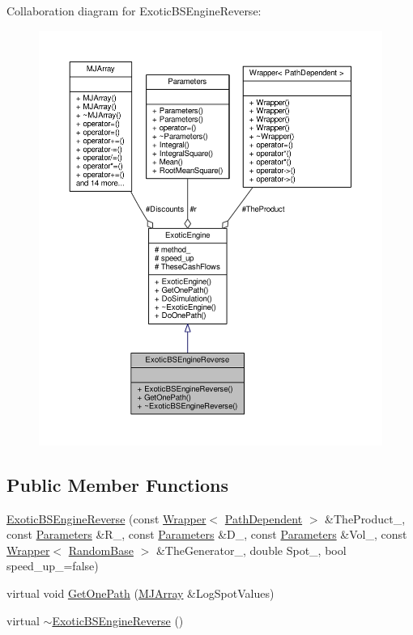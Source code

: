 Collaboration diagram for Exotic\+B\+S\+Engine\+Reverse\+:
\nopagebreak
\begin{figure}[H]
\begin{center}
\leavevmode
\includegraphics[width=350pt]{classExoticBSEngineReverse__coll__graph}
\end{center}
\end{figure}
\subsection*{Public Member Functions}
\begin{DoxyCompactItemize}
\item 
\hyperlink{classExoticBSEngineReverse_ad8068252390378408d6baa71d4c0049a}{Exotic\+B\+S\+Engine\+Reverse} (const \hyperlink{classWrapper}{Wrapper}$<$ \hyperlink{classPathDependent}{Path\+Dependent} $>$ \&The\+Product\+\_\+, const \hyperlink{classParameters}{Parameters} \&R\+\_\+, const \hyperlink{classParameters}{Parameters} \&D\+\_\+, const \hyperlink{classParameters}{Parameters} \&Vol\+\_\+, const \hyperlink{classWrapper}{Wrapper}$<$ \hyperlink{classRandomBase}{Random\+Base} $>$ \&The\+Generator\+\_\+, double Spot\+\_\+, bool speed\+\_\+up\+\_\+=false)
\item 
virtual void \hyperlink{classExoticBSEngineReverse_ad60a172cfb94070d61b07c4140949b74}{Get\+One\+Path} (\hyperlink{classMJArray}{M\+J\+Array} \&Log\+Spot\+Values)
\item 
virtual \hyperlink{classExoticBSEngineReverse_af436a230e87f2b0fc2b4508010e8eb49}{$\sim$\+Exotic\+B\+S\+Engine\+Reverse} ()
\end{DoxyCompactItemize}
